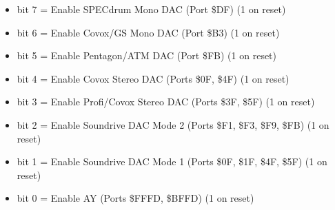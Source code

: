 \begin{itemize}
\item bit 7 = Enable SPECdrum Mono DAC (Port \$DF) (1 on reset)
\item bit 6 = Enable Covox/GS Mono DAC (Port \$B3) (1 on reset)
\item bit 5 = Enable Pentagon/ATM DAC (Port \$FB) (1 on reset)
\item bit 4 = Enable Covox Stereo DAC (Ports \$0F, \$4F) (1 on reset)
\item bit 3 = Enable Profi/Covox Stereo DAC (Ports \$3F, \$5F) (1 on
  reset)
\item bit 2 = Enable Soundrive DAC Mode 2 (Ports \$F1, \$F3, \$F9,
  \$FB) (1 on reset)
\item bit 1 = Enable Soundrive DAC Mode 1 (Ports \$0F, \$1F, \$4F,
  \$5F) (1 on reset)
\item bit 0 = Enable AY (Ports \$FFFD, \$BFFD) (1 on reset)
\end{itemize}

